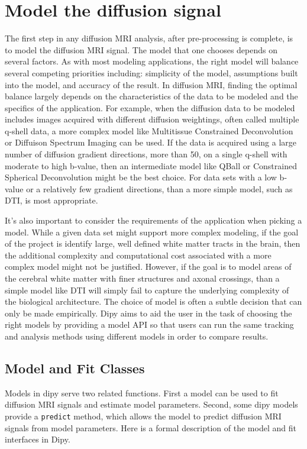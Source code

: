 \section{Model the diffusion signal}
The first step in any diffusion MRI analysis, after pre-processing is complete, is to model the diffusion MRI signal. The model that one chooses depends on several factors. As with most modeling applications, the right model will balance several competing priorities including: simplicity of the model, assumptions built into the model, and accuracy of the result. In diffusion MRI, finding the optimal balance largely depends on the characteristics of the data to be modeled and the specifics of the application. For example, when the diffusion data to be modeled includes images acquired with different diffusion weightings, often called multiple q-shell data, a more complex model like Multitissue Constrained Deconvolution or Diffuison Spectrum Imaging can be used. If the data is acquired using a large number of diffusion gradient directions, more than 50, on a single q-shell with moderate to high b-value, then an intermediate model like QBall or Constrained Spherical Deconvolution might be the best choice. For data sets with a low b-value or a relatively few gradient directions, than a more simple model, such as DTI, is most appropriate. 

It's also important to consider the requirements of the application when picking a model. While a given data set might support more complex modeling, if the goal of the project is identify large, well defined white matter tracts in the brain, then the additional complexity and computational cost associated with a more complex model might not be justified. However, if the goal is to model areas of the cerebral white matter with finer structures and axonal crossings, than a simple model like DTI will simply fail to capture the underlying complexity of the biological architecture. The choice of model is often a subtle decision that can only be made empirically. Dipy aims to aid the user in the task of choosing the right models by providing a model API so that users can run the same tracking and analysis methods using different models in order to compare results.

\subsection{Model and Fit Classes}
Models in dipy serve two related functions. First a model can be used to fit diffusion MRI signals and estimate model parameters. Second, some dipy models provide a \texttt{predict} method, which allows the model to predict diffusion MRI signals from model parameters. Here is a formal description of the model and fit interfaces in Dipy.

